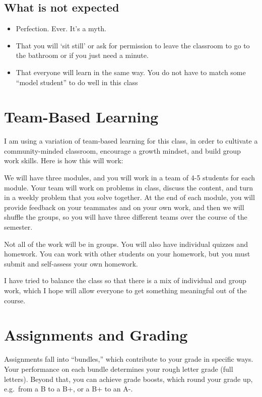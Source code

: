 \documentclass[
  letterpaper,
  DIV=11,
  numbers=noendperiod]{scrartcl}
\providecommand{\tightlist}{%
  \setlength{\itemsep}{0pt}\setlength{\parskip}{0pt}}\usepackage{longtable,booktabs,array}
\begin{document}
\subsection{What is not expected}

\begin{itemize}
\tightlist
\item
  Perfection. Ever. It's a myth.
\item
  That you will `sit still' or ask for permission to leave the classroom
  to go to the bathroom or if you just need a minute.
\item
  That everyone will learn in the same way. You do not have to match
  some ``model student'' to do well in this class
\end{itemize}

\section{Team-Based Learning}\label{tbl}

I am using a variation of team-based learning for this class, in order
to cultivate a community-minded classroom, encourage a growth mindset,
and build group work skills. Here is how this will work:

We will have three modules, and you will work in a team of 4-5 students
for each module. Your team will work on problems in class, discuss the
content, and turn in a weekly problem that you solve together. At the
end of each module, you will provide feedback on your teammates and on
your own work, and then we will shuffle the groups, so you will have
three different teams over the course of the semester.

Not all of the work will be in groups. You will also have individual
quizzes and homework. You can work with other students on your homework,
but you must submit and self-assess your own homework.

I have tried to balance the class so that there is a mix of individual
and group work, which I hope will allow everyone to get something
meaningful out of the course.

\section{Assignments and Grading}\label{assignments}

Assignments fall into ``bundles,'' which contribute to your grade in
specific ways. Your performance on each bundle determines your rough
letter grade (full letters). Beyond that, you can achieve grade boosts,
which round your grade up, e.g.~from a B to a B+, or a B+ to an A-.
\end{document}
